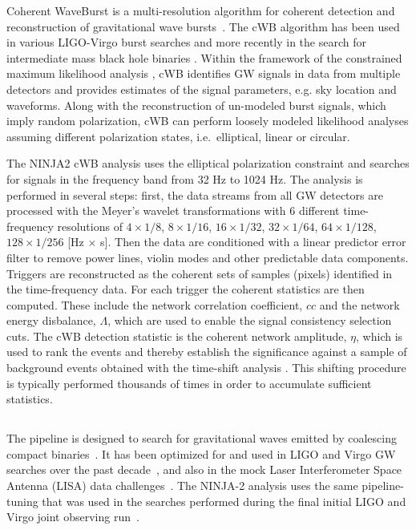 Coherent WaveBurst is a multi-resolution algorithm for coherent
detection and reconstruction of gravitational wave
bursts~\cite{Klimenko:2008fu}. The cWB algorithm has been used in
various LIGO-Virgo burst searches
\cite{Abbott:2007wu,Abadie:2010mt,Abadie:2012rq} and more recently in
the search for intermediate mass black hole binaries
\cite{Virgo:2012aa}.  Within the framework of the constrained maximum
likelihood analysis \cite{Klimenko:2008fu}, cWB identifies GW signals
in data from multiple detectors and provides estimates of the signal
parameters, e.g. sky location and waveforms.  Along with the
reconstruction of un-modeled burst signals, which imply random
polarization, cWB can perform loosely modeled likelihood analyses
assuming different polarization states, i.e.\ elliptical, linear or
circular.

The NINJA2 cWB analysis uses the elliptical polarization constraint 
\cite{Pankow:2009nx,Virgo:2012aa} and searches for signals in the frequency 
band from 32 Hz to 1024 Hz. The analysis is performed in several steps: first, 
the data streams from all GW detectors are processed with the Meyer's wavelet 
transformations with 6 different  time-frequency resolutions of 
$ 4\times1/8$, $8\times1/16$, $16\times1/32$, $32\times1/64$, 
$64\times1/128$, $128\times1/256$ [Hz $\times$ s]. Then the data are 
conditioned 
with a linear predictor error filter to remove power lines, violin modes 
and other predictable data components. Triggers are reconstructed as the 
coherent
sets of samples (pixels) identified in the time-frequency data. For each 
trigger the coherent 
statistics are then computed. These include the network correlation 
coefficient, ${cc}$ and the network energy disbalance, ${\Lambda}$, which are 
used to enable the signal consistency selection cuts. The cWB detection 
statistic is the coherent network amplitude, $\eta$, which is used to rank the 
events and thereby establish the significance against a sample of 
background events obtained with the time-shift analysis 
\cite{Klimenko:2008fu,Virgo:2012aa,Pankow:2009nx}. 
This shifting procedure is typically performed 
thousands of times in order to accumulate sufficient statistics.

\subsection{\ihope{}}
\label{ssec:ihope_pipelines}

The \ihope{} pipeline is designed to search for gravitational waves
emitted by coalescing compact binaries~\cite{Babak:2012zx}. It has been
optimized for and used in LIGO and Virgo GW searches over the past 
decade~\cite{Abbott:2007xi, Abbott:2009tt, Abbott:2009qj, Abadie:2010yb, 
Colaboration:2011np, Aasi:2012rja}, and also in the mock Laser 
Interferometer Space Antenna (LISA) data 
challenges~\cite{Babak:2008aa}. The NINJA-2 \ihope{} analysis uses the same 
pipeline-tuning that was used in the searches performed during 
the final initial LIGO and Virgo joint observing 
run~\cite{Colaboration:2011np}.

